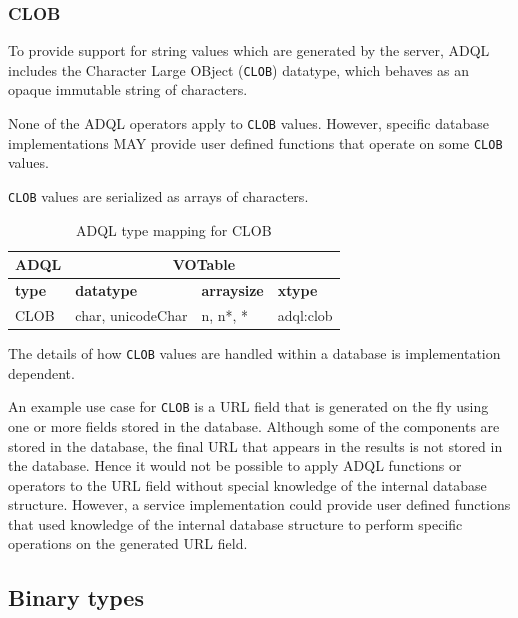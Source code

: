 \documentclass[11pt,a4paper]{ivoa}
\begin{document}
\subsubsection{CLOB}
\label{sec:types.character.clob}

To provide support for string values which are generated by the server,
ADQL includes the Character Large OBject (\verb:CLOB:) datatype,
which behaves as an opaque immutable string of characters.

None of the ADQL operators apply to \verb:CLOB: values.
However, specific database implementations MAY provide user
defined functions that operate on some \verb:CLOB: values.

\verb:CLOB: values are serialized as arrays of characters.

\begin{table}[h]\footnotesize
    \begin{tabular}
        {|p{}|p{}|p{}|p{}|}

        \hline
        \multicolumn{1}{|c|}{\textbf{ADQL}} &
        \multicolumn{3}{|c|}{\textbf{VOTable}}
        \tabularnewline

        \hline
        \textbf{type} &
        \textbf{datatype} &
        \textbf{arraysize} &
        \textbf{xtype}
        \tabularnewline

        \hline
        CLOB &
        char, unicodeChar &
        n, n*, * &
        adql:clob
        \tabularnewline
        \hline
    \end{tabular}
    \caption{ADQL type mapping for CLOB}
    \label{table:types.character.clob}
\end{table}

The details of how \verb:CLOB: values are handled within a
database is implementation dependent.

An example use case for \verb:CLOB: is a URL field that is generated on the fly
using one or more fields stored in the database.
Although some of the components are stored in the database, the final URL
that appears in the results is not stored in the database.
Hence it would not be possible to apply ADQL functions or operators to the
URL field without special knowledge of the internal database structure.
However, a service implementation could provide user defined functions
that used knowledge of the internal database structure to perform
specific operations on the generated URL field.

\subsection{Binary types}
\label{sec:types.binary}
\end{document}
